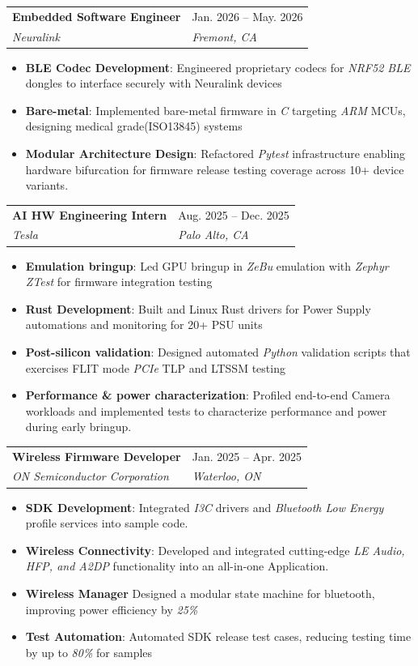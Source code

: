 \documentclass[letterpaper,11pt]{article}
\makeatletter
\newcommand{\resumeItem}[1]{
  \item\small{
    {#1 \vspace{-2pt}}
  }
}
\newcommand{\resumeSubheading}[4]{
  \vspace{-1pt}\item
  \begin{tabular*}{0.95\textwidth}[t]{>{\raggedright\arraybackslash}p{0.72\textwidth}@{\extracolsep{\fill}}>{\raggedleft\arraybackslash}p{0.23\textwidth}}
      	\textbf{#1} & #2 \\
      	\textit{\small#3} & \textit{\small #4} \\
    \end{tabular*}\vspace{-7pt}
}
\newcommand{\resumeItemListStart}{\begin{itemize}}
\newcommand{\resumeItemListEnd}{\end{itemize}\vspace{-5pt}}
\makeatother
\begin{document}
  \resumeSubheading
  {Embedded Software Engineer}{Jan. 2026 -- May. 2026}
  {Neuralink}{Fremont, CA}
  \resumeItemListStart
  \resumeItem{\textbf{BLE Codec Development}: Engineered proprietary codecs for \emph{NRF52 BLE} dongles to interface securely with Neuralink devices}
  \resumeItem{\textbf{Bare-metal}: Implemented bare-metal firmware in \emph{C} targeting \emph{ARM} MCUs, designing medical grade(ISO13845) systems}
  \resumeItem{\textbf{Modular Architecture Design}: Refactored \emph{Pytest} infrastructure enabling hardware bifurcation for firmware release testing coverage across 10+ device variants.}
  \resumeItemListEnd
 \resumeSubheading
  {AI HW Engineering Intern}{Aug. 2025 -- Dec. 2025}
  {Tesla}{Palo Alto, CA}
  \resumeItemListStart
  \resumeItem{\textbf{Emulation bringup}: Led GPU bringup in \emph{ZeBu} emulation with \emph{Zephyr ZTest} for firmware integration testing}
  \resumeItem{\textbf{Rust Development}: Built and Linux Rust drivers for Power Supply automations and monitoring for 20+ PSU units}
  \resumeItem{\textbf{Post-silicon validation}: Designed automated \emph{Python} validation scripts that exercises FLIT mode \emph{PCIe}  TLP and LTSSM testing } 
  \resumeItem{\textbf{Performance \& power characterization}: Profiled end-to-end Camera workloads and implemented tests to characterize performance and power during early bringup.}
  \resumeItemListEnd
  
  \resumeSubheading
  {Wireless Firmware Developer}{Jan. 2025 -- Apr. 2025}
  {ON Semiconductor Corporation}{Waterloo, ON}
  \resumeItemListStart
     \resumeItem{\textbf{SDK Development}: Integrated \emph{I3C} drivers and \emph{Bluetooth Low Energy} profile services into sample code.}
     \resumeItem{\textbf{Wireless Connectivity}: Developed and integrated cutting-edge \emph{LE Audio, HFP, and A2DP} functionality into an all-in-one Application.}
     \resumeItem{\textbf{Wireless Manager} Designed a modular state machine for bluetooth, improving power efficiency by \emph{25\%}}
     \resumeItem{\textbf{Test Automation}: Automated SDK release test cases, reducing testing time by up to \emph{80\%} for samples}
  \resumeItemListEnd
\end{document}
